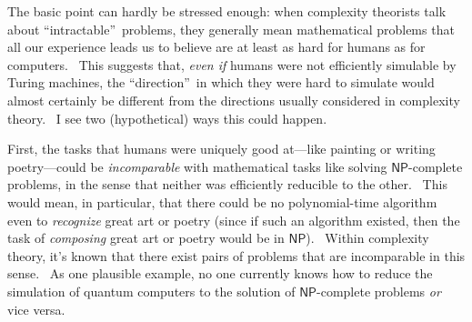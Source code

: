 \documentclass[11pt,onecolumn]{article}%
\begin{document}
The basic point can hardly be stressed enough: when complexity theorists talk
about \textquotedblleft intractable\textquotedblright\ problems, they
generally mean mathematical problems that all our experience leads us to
believe are at least as hard for humans as for computers. \ This suggests
that, \textit{even if} humans were not efficiently simulable by Turing
machines, the \textquotedblleft direction\textquotedblright\ in which they
were hard to simulate would almost certainly be different from the directions
usually considered in complexity theory. \ I see two (hypothetical) ways this
could happen.

First, the tasks that humans were uniquely good at---like painting or writing
poetry---could be \textit{incomparable} with mathematical tasks like solving
$\mathsf{NP}$-complete problems, in the sense that neither was efficiently
reducible to the other. \ This would mean, in particular, that there could be
no polynomial-time algorithm even to \textit{recognize} great art or poetry
(since if such an algorithm existed, then the task of \textit{composing} great
art or poetry would be in $\mathsf{NP}$). \ Within complexity theory, it's
known that there exist pairs of problems that are incomparable in this sense.
\ As one plausible example, no one currently knows how to reduce the
simulation of quantum computers to the solution of $\mathsf{NP}$-complete
problems \textit{or} vice versa.
\end{document}
